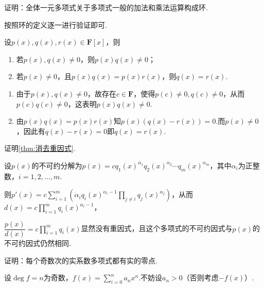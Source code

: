 \begin{exercise}

    \begin{exgroup}
        \item 证明：全体一元多项式关于多项式一般的加法和乘法运算构成环.
        \begin{answer}
            按照环的定义逐一进行验证即可.
        \end{answer}
        \item 设$p(x),q(x),r(x)\in\mathbf{F}[x]$，则
        \begin{enumerate}
            \item 若$p(x),q(x)\neq 0$，则$p(x)q(x)\neq 0$；
            \item 若$p(x)\neq 0$，且$p(x)q(x)=p(x)r(x)$，则$q(x)=r(x)$.
        \end{enumerate}
        \begin{answer}
            \begin{enumerate}
                \item 由于$p(x),q(x)\neq 0$，故存在$c\in \mathbf{F}$，使得$p(c)\neq 0,q(c)\neq 0$，从而$p(c)q(c)\neq0$，这表明$p(x)q(x)\neq 0$.
                \item 由$p(x)q(x)=p(x)r(x)$知$p(x)(q(x)-r(x))=0$.而$p(x)\neq0$，因此有$q(x)-r(x)=0$即$q(x)=r(x)$.
            \end{enumerate}
        \end{answer}
        \item 证明\autoref{thm:消去重因式}.
        \begin{answer}
            设$p(x)$的不可约分解为$p(x)=cq_1(x)^{\alpha_1}q_2(x)^{\alpha_2}\cdots q_m(x)^{\alpha_m}$，其中$\alpha_i$为正整数，$i=1,2,\ldots,m$.

            则$p'(x)=c\displaystyle\sum_{i=1}^{m}(\alpha_i q_i(x)^{\alpha_i-1}\displaystyle\prod_{j\neq i}q_j(x)^{\alpha_j})$，从而$d(x)=c\prod_{i=1}^{m}q_i(x)^{\alpha_i-1}$，

            $\dfrac{p(x)}{d(x)}=c\prod_{i=1}^{m}q_i(x)$显然没有重因式，且这个多项式的不可约因式与$p(x)$的不可约因式仍然相同.
        \end{answer}
        \item 证明：每个奇数次的实系数多项式都有实的零点.
        \begin{answer}
            设$\deg f=n$为奇数，$f(x)=\displaystyle\sum_{i=0}^{n}a_nx^n$.不妨设$a_n>0$（否则考虑$-f(x)$）.


\end{answer}
\end{exgroup}
\end{exercise}
